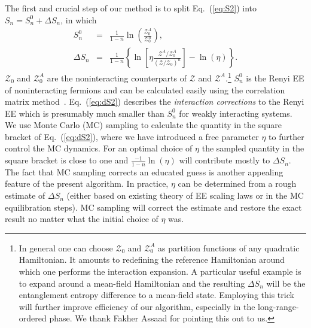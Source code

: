 \documentclass[12pt,onecolumn,english,prl,showpacs,nofootinbib]{revtex4-1}
\begin{document}


The first and crucial step of our method is to split Eq.~(\ref{eq:S2}) into  $S_{n} = S_{n}^{0} + \Delta S_{n}$, in which 
\begin{eqnarray}
S_{n}^{0}  & =& \frac{1}{1-n} \ln\left(\frac{\mathcal{Z}_{0}^{A}}{\mathcal{Z}_{0}^{n}}\right), \\ 
\Delta S_{n} & = & \frac{1}{1-n} \left\{ \ln\left[\eta \frac{\mathcal{Z}^{A}/\mathcal{Z}_{0}^{A}}{ (\mathcal{Z}/ \mathcal{Z}_{0}  )^{n}}\right] - \ln(\eta) \right\}.    
\label{eq:dS2}
\end{eqnarray}
$\mathcal{Z}_{0}$ and $\mathcal{Z}_{0}^{A}$ are the noninteracting counterparts of $\mathcal{Z}$ and $\mathcal{Z}^{A}$.\footnote{In general one can choose $\mathcal{Z}_{0}$ and $\mathcal{Z}^{A}_{0}$ as partition functions of any quadratic Hamiltonian. It amounts to redefining the reference Hamiltonian around which one performs the interaction expansion. A particular useful example is to expand around a mean-field Hamiltonian and the resulting $\Delta S_{n}$ will be the entanglement entropy difference to a mean-field state. Employing this trick will further improve efficiency of our algorithm, especially in the long-range-ordered phase. We thank Fakher Assaad for pointing this out to us.} $S_{n}^{0} $ is the Renyi EE of noninteracting fermions and can be calculated easily using the correlation matrix method~\cite{Peschel:2002gz, SM}. Eq.~(\ref{eq:dS2}) describes the \emph{interaction corrections} to the Renyi EE which is presumably much smaller than $S_{n}^{0}$ for weakly interacting systems. We use Monte Carlo (MC) sampling to calculate the quantity in the square bracket of Eq.~(\ref{eq:dS2}), where we have introduced a free parameter $\eta$ to further control the MC dynamics. For an optimal choice of $\eta$ the sampled quantity in the square bracket is close to one and  $\frac{-1}{1-n}\ln(\eta)$ will contribute mostly to $\Delta S_{n}$. The fact that MC sampling corrects an educated guess is another appealing feature of the present algorithm. In practice, $\eta$ can be determined from a rough estimate of $\Delta S_{n}$ (either based on existing theory of EE scaling laws or in the MC equilibration steps). MC sampling will correct the estimate and restore the exact result no matter what the initial choice of $\eta$ was. 
\end{document}
